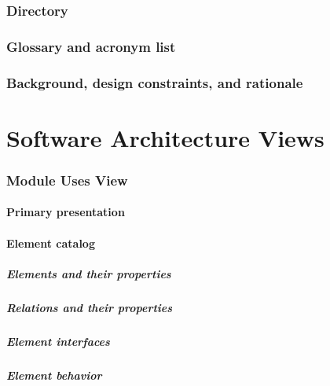 \documentclass[a4paper,10pt]{article}
\begin{document}
\section{Directory}

\clearpage
\section{Glossary and acronym list}

\clearpage
\section{Background, design constraints, and rationale}



\part{Software Architecture Views}
\setcounter{section}{0}

\clearpage
\section{Module Uses View}

\subsection{Primary presentation}



\subsection{Element catalog}

\subsubsection{Elements and their properties}

\subsubsection{Relations and their properties}

\subsubsection{Element interfaces}

\subsubsection{Element behavior}
\end{document}
